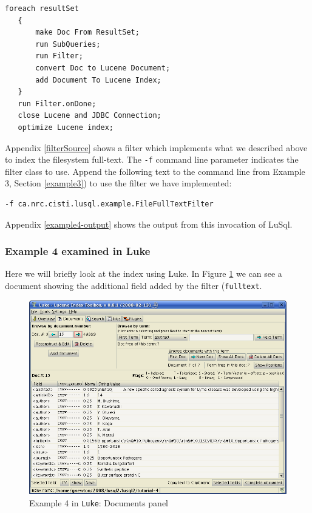 \begin{lstlisting}[backgroundcolor=\color{grey}]
   foreach resultSet
   {
       make Doc From ResultSet;
       run SubQueries;
       run Filter;
       convert Doc to Lucene Document;
       add Document To Lucene Index;
   }
   run Filter.onDone;
   close Lucene and JDBC Connection;
   optimize Lucene index;
\end{lstlisting}

Appendix \ref{filterSource} shows a filter which implements what we described
above to index the filesystem full-text.
The {\tt -f} command line parameter indicates the filter class to use. 
Append the following text to the command line from Example 3,
Section \ref{example3}) to use the filter we have implemented:
{\small
\begin{lstlisting}[backgroundcolor=\color{grey}]
 -f ca.nrc.cisti.lusql.example.FileFullTextFilter   
\end{lstlisting}
}

Appendix \ref{example4-output} shows the output from this invocation of LuSql.


\subsubsection{Example 4 examined in Luke}
Here we will briefly look at the index using Luke.
In Figure \ref{luke_4_1} we can see a document showing the additional field
added by the filter ({\tt fulltext}.
  \begin{figure}
  \begin{center}
 \includegraphics[width=\textwidth]{images/luke_4_1.png}
      \end{center}
  \caption{Example 4 in {\tt Luke}: Documents panel}
\label{luke_4_1}
\end{figure}
